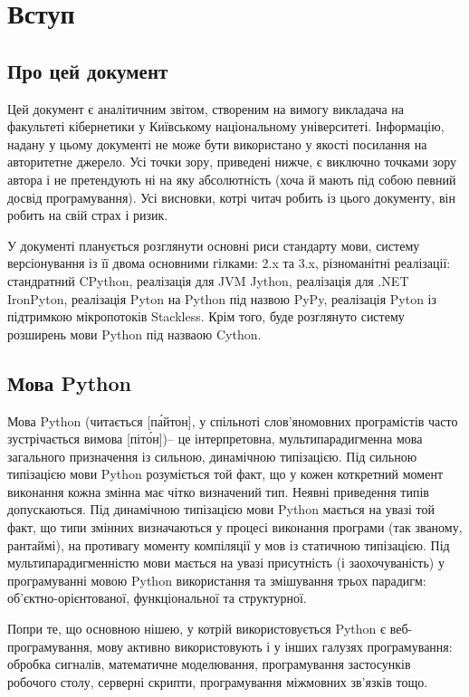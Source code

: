 \documentclass[a4paper, 12pt]{article}
\begin{document}
\section{Вступ}

\subsection{Про цей документ}

Цей документ є аналітичним звітом, створеним на вимогу викладача на факультеті кібернетики у Київському
національному університеті. Інформацію, надану у цьому документі не може бути використано у якості посилання на
авторитетне джерело. Усі точки зору, приведені нижче, є виключно точками зору автора і не претендують ні на яку
абсолютність (хоча й мають під собою певний досвід програмування). Усі висновки, котрі читач робить із цього
документу, він робить на свій страх і ризик.

У документі планується розглянути основні риси стандарту мови, систему версіонування із її двома основними
гілками: 2.x та 3.x, різноманітні реалізації: стандратний CPython, реалізація для JVM Jython, реалізація для 
.NET IronPyton, реалізація Pyton на Python під назвою PyPy, реалізація Pyton із підтримкою мікропотоків Stackless. Крім того, буде розглянуто систему розширень мови Python під назваою Cython.

\subsection{Мова Python}

Мова Python (читається [п\'{а}йтон], у спільноті слов'яномовних програмістів 
часто зустрічається вимова [піт\'{о}н])-- 
це інтерпретовна, мультипарадигменна мова загального призначення із сильною,
динамічною типізацією. Під сильною типізацією мови Python розуміється той факт, що у кожен коткретний момент
виконання кожна змінна має чітко визначений тип. Неявні приведення типів допускаються. Під динамічною типізацією
мови Python мається на увазі той факт, що типи змінних визначаються у процесі виконання програми (так званому,
рантаймі), на противагу моменту компіляції у мов із статичною типізацією. Під мультипарадигменністю мови мається
на увазі присутність (і заохочуваність) у програмуванні мовою Python використання та змішування трьох парадигм:
об'єктно-орієнтованої, функціональної та структурної.

Попри те, що основною нішею, у котрій використовується Python є веб-програмування, мову активно використовують і
у інших галузях програмування: обробка сигналів, математичне моделювання, програмування застосунків робочого
столу, серверні скрипти, програмування міжмовних зв'язків тощо.
\end{document}
